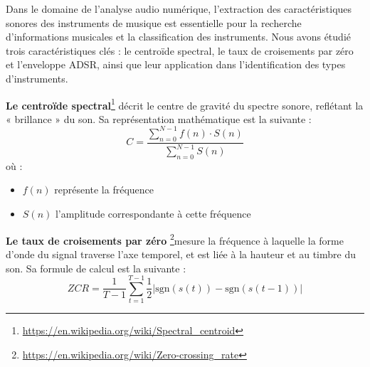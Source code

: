 Dans le domaine de l'analyse audio numérique, l'extraction des caractéristiques sonores des instruments de musique est essentielle pour la recherche d'informations musicales et la classification des instruments. Nous avons étudié trois caractéristiques clés : le centroïde spectral, le taux de croisements par zéro et l'enveloppe ADSR, ainsi que leur application dans l'identification des types d'instruments.

\textbf{Le centroïde spectral}\footnote{\href{https://en.wikipedia.org/wiki/Spectral_centroid}{https://en.wikipedia.org/wiki/Spectral\_centroid}} décrit le centre de gravité du spectre sonore, reflétant la « brillance » du son. Sa représentation mathématique est la suivante : 
\begin{equation}
    C = \frac{\sum_{n=0}^{N-1}f(n)\cdot S(n)}{\sum_{n=0}^{N-1}S(n)} 
\end{equation}
où :
\begin{itemize}
    \item \(f(n)\) représente la fréquence
    \item \(S(n)\) l'amplitude correspondante à cette fréquence
\end{itemize}

\textbf{Le taux de croisements par zéro} \footnote{\href{https://en.wikipedia.org/wiki/Zero-crossing_rate}{https://en.wikipedia.org/wiki/Zero-crossing\_rate}}mesure la fréquence à laquelle la forme d'onde du signal traverse l'axe temporel, et est liée à la hauteur et au timbre du son. Sa formule de calcul est la suivante :
\begin{equation}
    ZCR = \frac{1}{T-1}\sum_{t=1}^{T-1}\frac{1}{2}|\text{sgn}(s(t))-\text{sgn}(s(t-1))|
\end{equation}

